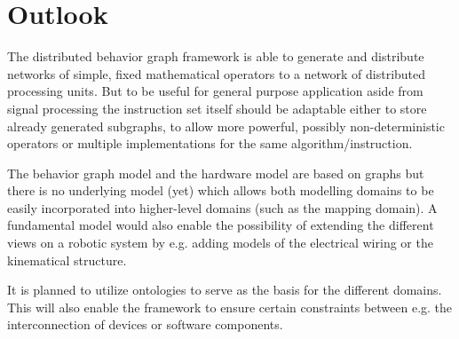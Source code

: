 \documentclass[a4paper,twocolumn]{esapub2005} %
\begin{document}
\section{Outlook}
The distributed behavior graph framework is able to generate and distribute networks of simple, fixed mathematical operators to a network of distributed processing units.
But to be useful for general purpose application aside from signal processing the instruction set itself should be adaptable either to store already generated subgraphs, to allow more powerful, possibly non-deterministic operators or multiple implementations for the same algorithm/instruction.

The behavior graph model and the hardware model are based on graphs but there is no underlying model (yet) which allows both modelling domains to be easily incorporated into higher-level domains (such as the mapping domain).
A fundamental model would also enable the possibility of extending the different views on a robotic system by e.g. adding models of the electrical wiring or the kinematical structure.

It is planned to utilize ontologies to serve as the basis for the different domains.
This will also enable the framework to ensure certain constraints between e.g. the interconnection of devices or software components.



\end{document}
